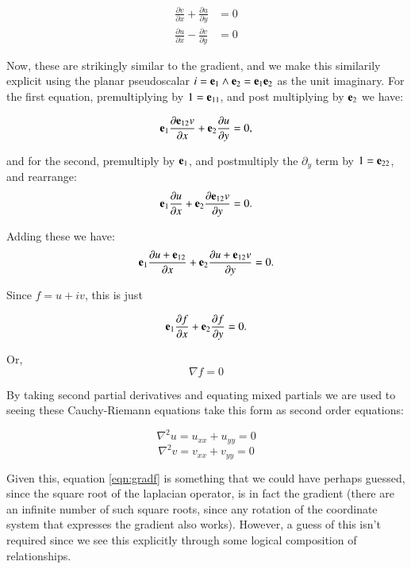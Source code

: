 \documentclass{article}
\newcommand{\grad}[0]{\nabla}
\begin{document}
\begin{align}
\frac{\partial v}{\partial x} + \frac{\partial u}{\partial y} &= 0 \\
\frac{\partial u}{\partial x} - \frac{\partial v}{\partial y} &= 0
\end{align}

Now, these are strikingly similar to the gradient, and we make this similarily explicit using the planar
pseudoscalar
$i=\mathbf{e}_1 \wedge \mathbf{e}_2 = \mathbf{e}_1 \mathbf{e}_2$
as the unit imaginary.  For the first equation, premultiplying by $1 = \mathbf{e}_{11}$, and post multiplying by $\mathbf{e}_2$ we have:

\begin{equation*}
\mathbf{e}_1 \frac{\partial \mathbf{e}_{12} v}{\partial x} + \mathbf{e}_{2}\frac{\partial u}{\partial y} = 0,
\end{equation*}

and for the second, premultiply by $\mathbf{e}_1$, and postmultiply the $\partial_y$ term by $1 = \mathbf{e}_{22}$, and rearrange:
\begin{equation*}
\mathbf{e}_1 \frac{\partial u}{\partial x} + \mathbf{e}_{2} \frac{\partial \mathbf{e}_{12} v}{\partial y} = 0.
\end{equation*}

Adding these we have:
\begin{equation*}
\mathbf{e}_1 \frac{\partial u + \mathbf{e}_{12}}{\partial x} + \mathbf{e}_{2} \frac{\partial u + \mathbf{e}_{12} v}{\partial y} = 0.
\end{equation*}

Since $f = u + i v$, this is just

\begin{equation}
\mathbf{e}_1 \frac{\partial f}{\partial x} + \mathbf{e}_{2} \frac{\partial f}{\partial y} = 0.
\end{equation}

Or,
\begin{equation}\label{eqn:gradf}
\grad f = 0
\end{equation}

By taking second partial derivatives and equating mixed partials we are used to seeing these Cauchy-Riemann equations
take this form as second order equations:

\begin{equation}\label{eqn:uxx}
\grad^2 u = u_{xx} + u_{yy} = 0
\end{equation}
\begin{equation}
\grad^2 v = v_{xx} + v_{yy} = 0
\end{equation}

Given this, equation \ref{eqn:gradf} is something that we could have perhaps guessed, since the square root of the laplacian operator, is in fact the gradient (there are an infinite number of such square roots, since any rotation of the coordinate system that expresses the gradient also works).  However, a guess of this isn't required since we see this explicitly through some logical composition of relationships.
\end{document}
